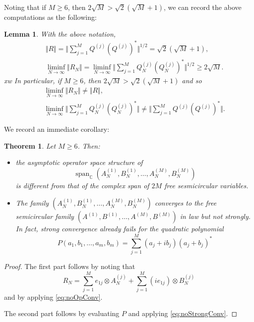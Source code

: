 \documentclass[10pt,a4paper]{amsart}
\newtheorem{theorem}{Theorem}
\newtheorem{lemma}{Lemma}
\begin{document}
Noting that if $M\geq 6$, then $2\sqrt{M} > \sqrt{2}(\sqrt{M}+1)$, we can record the above computations as the following: 
\begin{lemma}
    \label{lemma:WrongOperatorSpaceStructure}
    With the above notation, 
    \begin{eqnarray} && \Vert R \Vert = \Big\Vert \sum_{j=1}^M Q^{(j)} (Q^{(j)})^* \Big\Vert^{1/2} = \sqrt{2}(\sqrt{M}+1),\\ && \liminf_{N\to\infty}  \Vert R_N \Vert = 
    \liminf_{N\to\infty} \Big\Vert \sum_{j=1}^M Q_N^{(j)} (Q_N^{(j)})^*\Big\Vert^{1/2} \geq 2\sqrt{M}.\end{eqnarray} xw
    In particular, if $M\geq 6$, then $2\sqrt{M}>\sqrt{2}(\sqrt{M}+1)$ and so \begin{eqnarray}
        &&\liminf_{N\to\infty} \Vert R_N\Vert \neq \Vert R \Vert,\label{eq:noOpConv}\\
        &&\liminf_{N\to\infty}\Big\Vert \sum_{j=1}^M Q_N^{(j)} (Q_N^{(j)})^*\Big\Vert \neq \Big\Vert \sum_{j=1}^M Q^{(j)} (Q^{(j)})^* \Big\Vert.\label{eq:noStrongConv}
    \end{eqnarray} 
\end{lemma}
We record an immediate corollary: 


\begin{theorem}
   \label{thrm:noStrong}
    Let $M\geq 6$.  Then: 
    \begin{itemize}
    \item[(i)] the asymptotic operator space structure of  $$\operatorname{span}_\mathbb{C}(A_N^{(1)},B_N^{(1)},\dots,A_N^{(M)},B_N^{(M)})$$  is different from that of the complex span of $2M$ free sesmicircular variables.  
    \item[(ii)] The family $(A_N^{(1)},B_N^{(1)},\dots,A_N^{(M)},B_N^{(M)})$ converges to the free semicircular family $(A^{(1)},B^{(1)},\dots,A^{(M)},B^{(M)})$ in law but not strongly. In fact, strong convergence already fails for the quadratic polynomial $$P(a_1,b_1,\dots,a_m,b_m)=\sum_{j=1}^M  (a_j + i b_j)(a_j + b_j)^*$$
    \end{itemize}
\end{theorem}

\begin{proof}
    The first part follows by  noting that $$R_N =  \sum_{j=1}^M e_{1j} \otimes A_N^{(j)} + \sum_{j=1}^M (i e_{1j})\otimes B_N^{(j)}$$ and by applying \eqref{eq:noOpConv}.

    The second part follows by evaluating $P$ and applying \eqref{eq:noStrongConv}.
\end{proof}
\end{document}
